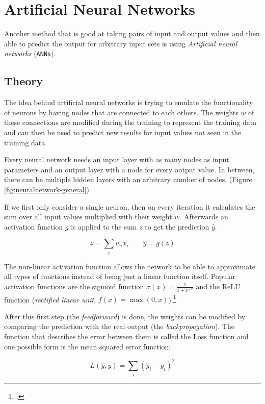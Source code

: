 \section{Artificial Neural Networks}

Another method that is good at taking pairs of input and output values and then able to predict the output for arbitrary input sets is using \textit{Artificial neural networks} (\texttt{ANNs}).

\subsection{Theory}

The idea behind artificial neural networks is trying to emulate the functionality of neurons by having nodes that are connected to each others. The weights $w$ of these connections are modified during the training to represent the training data and can then be used to predict new results for input values not seen in the training data.

Every neural network needs an input layer with as many nodes as input parameters and an output layer with a node for every output value. In between, there can be multiple hidden layers with an arbitrary number of nodes. (Figure \ref{fig:neuralnetwork-general})

If we first only consider a single neuron, then on every iteration it calculates the sum over all input values multiplied with their weight $w$. Afterwards an activation function $g$ is applied to the sum $z$ to get the prediction $\hat{y}$.

\begin{equation}
	z=\sum_{i}w_ix_i \qquad \hat{y}=g(z)
\end{equation}

The non-linear activation function allows the network to be able to approximate all types of functions instead of being just a linear function itself. Popular activation functions are the sigmoid function $\sigma(x)={\frac {1}{1+e^{-x}}}$ and the ReLU function (\textit{rectified linear unit}, $f(x)=\max(0,x)$).\footcite{NN-math}

After this first step (the \textit{feedforward}) is done, the weights can be modified by comparing the prediction with the real output (the \textit{backpropagation}). The function that describes the error between them is called the Loss function and one possible form is the mean squared error function:

\begin{equation}
	L(\hat{y},y)=\sum_{i}(\hat{y}_i-y_i)^2
\end{equation}

